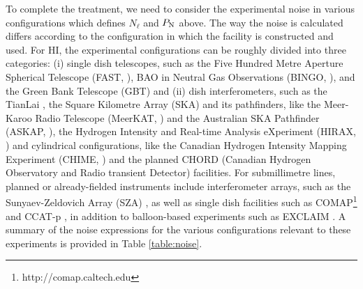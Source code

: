 To complete the treatment, we need to consider the experimental noise in various configurations which defines  $N_{\ell}$ and $P_{\rm N}$ above.  The way the noise is calculated differs according to the configuration in which the facility is constructed and used. For HI, the experimental configurations can be roughly divided into three categories: (i) single dish telescopes, such as the Five Hundred Metre Aperture Spherical Telescope (FAST, \cite{smoot2017}), BAO in Neutral Gas Observations (BINGO, \cite{battye2012}), and the Green Bank Telescope (GBT) and  (ii) dish interferometers, such as the TianLai \cite{chen2012}, the Square Kilometre Array (SKA) and its pathfinders, like the Meer-Karoo Radio Telescope (MeerKAT, \cite{santos2017}) and the Australian SKA Pathfinder (ASKAP, \cite{johnston2008}), the Hydrogen Intensity and Real-time Analysis eXperiment (HIRAX, \cite{newburgh2016}) and cylindrical configurations, like the Canadian Hydrogen Intensity Mapping Experiment (CHIME, \cite{bandura2014}) and the planned CHORD (Canadian Hydrogen Observatory and Radio transient Detector) \cite{liu2019} facilities. For submillimetre lines, planned or already-fielded instruments include interferometer arrays, such as the Sunyaev-Zeldovich Array (SZA) \cite{keating2016}, as well as single dish facilities such as COMAP\footnote{http://comap.caltech.edu} and CCAT-p \cite{terry2019, parshley2018}, in addition to balloon-based experiments such as EXCLAIM \cite{exclaimpaper2020}. A summary of the noise expressions for the various configurations relevant to these experiments is provided in Table \ref{table:noise}. 



